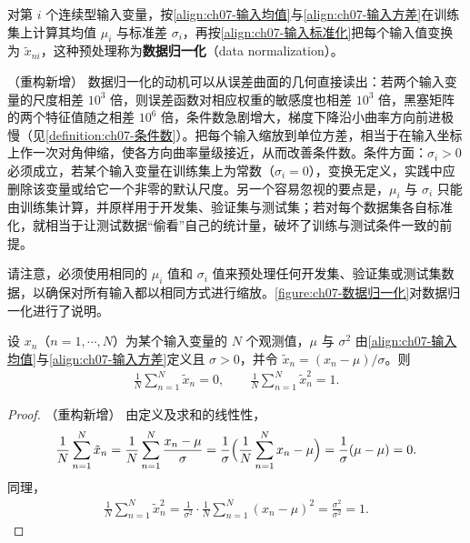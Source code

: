 \documentclass[../../main.tex]{subfiles}
\begin{document}
\begin{definition}[数据归一化]\label{definition:ch07-数据归一化}
对第 $i$ 个连续型输入变量，按\eqref{align:ch07-输入均值}与\eqref{align:ch07-输入方差}在训练集上计算其均值 $\mu_i$ 与标准差 $\sigma_i$，再按\eqref{align:ch07-输入标准化}把每个输入值变换为 $\tilde{x}_{ni}$，这种预处理称为\textbf{数据归一化}（data normalization）。
\end{definition}

\begin{remark}（重构新增）
数据归一化的动机可以从误差曲面的几何直接读出：若两个输入变量的尺度相差 $10^{3}$ 倍，则误差函数对相应权重的敏感度也相差 $10^{3}$ 倍，黑塞矩阵的两个特征值随之相差 $10^{6}$ 倍，条件数急剧增大，梯度下降沿小曲率方向前进极慢（见\cref{definition:ch07-条件数}）。把每个输入缩放到单位方差，相当于在输入坐标上作一次对角伸缩，使各方向曲率量级接近，从而改善条件数。条件方面：$\sigma_i>0$ 必须成立，若某个输入变量在训练集上为常数（$\sigma_i=0$），变换无定义，实践中应删除该变量或给它一个非零的默认尺度。另一个容易忽视的要点是，$\mu_i$ 与 $\sigma_i$ 只能由训练集计算，并原样用于开发集、验证集与测试集；若对每个数据集各自标准化，就相当于让测试数据“偷看”自己的统计量，破坏了训练与测试条件一致的前提。
\end{remark}

请注意，必须使用相同的 $\mu_i$ 值和 $\sigma_i$ 值来预处理任何开发集、验证集或测试集数据，以确保对所有输入都以相同方式进行缩放。\cref{figure:ch07-数据归一化}对数据归一化进行了说明。

\begin{proposition}[标准化变量的矩]\label{proposition:ch07-标准化矩}
设 $x_{n}$（$n=1,\cdots,N$）为某个输入变量的 $N$ 个观测值，$\mu$ 与 $\sigma^{2}$ 由\eqref{align:ch07-输入均值}与\eqref{align:ch07-输入方差}定义且 $\sigma>0$，并令 $\tilde{x}_{n}=(x_{n}-\mu)/\sigma$。则
\begin{align}
\frac{1}{N}\sum_{n=1}^{N}\tilde{x}_{n}=0,\qquad
\frac{1}{N}\sum_{n=1}^{N}\tilde{x}_{n}^{2}=1.
\label{align:ch07-标准化矩}
\end{align}
\end{proposition}
\begin{proof}（重构新增）
由定义及求和的线性性，
\begin{align*}
\frac{1}{N}\sum_{n=1}^{N}\tilde{x}_{n}
= \frac{1}{N}\sum_{n=1}^{N}\frac{x_{n}-\mu}{\sigma}
= \frac{1}{\sigma}\Bigl(\frac{1}{N}\sum_{n=1}^{N}x_{n}-\mu\Bigr)
= \frac{1}{\sigma}(\mu-\mu) = 0.
\end{align*}
同理，
\begin{align*}
\frac{1}{N}\sum_{n=1}^{N}\tilde{x}_{n}^{2}
= \frac{1}{\sigma^{2}}\cdot\frac{1}{N}\sum_{n=1}^{N}(x_{n}-\mu)^{2}
= \frac{\sigma^{2}}{\sigma^{2}} = 1.
\end{align*}
\end{proof}
\end{document}
